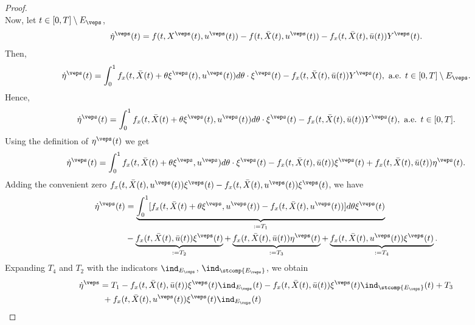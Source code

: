 \begin{proof}
\begin{equation*}
    \end{equation*}
    Now, let $t \in [0,T] \setminus E_{\veps}$,
    \begin{equation*}
        \Dot{\eta}^{\veps}(t) = f(t, X^{\veps}(t), u^{\veps}(t)) - f(t, \Bar{X}(t), u^{\veps}(t)) - f_x(t, \Bar{X}(t), \Bar{u}(t))Y^{\veps}(t).
    \end{equation*}
    Then,
    \begin{equation*}
        \Dot{\eta}^{\veps}(t) = \int_{0}^{1} f_{x}(t, \Bar{X}(t) + \theta \xi^{\veps}(t), u^{\veps}(t))d\theta \cdot  \xi^{\veps}(t)  - f_x(t, \Bar{X}(t), \Bar{u}(t))Y^{\veps}(t), \text{ a.e. } t \in [0,T]\setminus E_{\veps}.
    \end{equation*}
    Hence, 
    \begin{equation*}
        \Dot{\eta}^{\veps}(t) = \int_{0}^{1} f_{x}(t, \Bar{X}(t) + \theta \xi^{\veps}(t), u^{\veps}(t))d\theta \cdot  \xi^{\veps}(t)  - f_x(t, \Bar{X}(t), \Bar{u}(t))Y^{\veps}(t), \text{ a.e. } t \in [0,T] .
    \end{equation*}
    Using the definition of $\eta ^{\veps}(t)$ we get
    \begin{equation*}
        \Dot{\eta}^{\veps}(t) = \int_{0}^{1} f_x(t, \Bar{X}(t) + \theta \xi^{\veps}, u^{\veps})d\theta \cdot \xi^{\veps}(t) - f_x(t, \Bar{X}(t), \Bar{u}(t))\xi^{\veps}(t) + f_x(t, \Bar{X}(t), \Bar{u}(t))\eta^{\veps}(t).
    \end{equation*}
    Adding the convenient zero $f_x(t, \Bar{X}(t), u^{\veps}(t))\xi^{\veps}(t) - f_x(t, \Bar{X}(t), u^{\veps}(t))\xi^{\veps}(t)$, we have
    \begin{align*}
        \Dot{\eta}^{\veps}(t) &= \underbrace{\int_{0}^{1} [f_x(t, \Bar{X}(t) + \theta \xi^{\veps}, %
        u^{\veps}(t)) - f_{x}(t, \Bar{X}(t), u^{\veps}(t))]d\theta \xi^{\veps}(t)}_{:=T_1} \\
        & - \underbrace{f_x(t, \Bar{X}(t), \Bar{u}(t))\xi^{\veps}(t)}_{:=T_2} + \underbrace{f_x(t, \Bar{X}(t), \Bar{u}(t))\eta^{\veps}(t)}_{:=T_3} + \underbrace{f_x(t, \Bar{X}(t), u^{\veps}(t))\xi^{\veps}(t)}_{:=T_4}.
    \end{align*}
    Expanding $T_4$ and $T_2$ with the indicators $\ind_{E_{\veps}}$, 
    $\ind_{\stcomp{E_{\veps}}}$, we obtain
    \begin{align*}
        \Dot{\eta}^{\veps} &=
            T_1 - f_x(t,\Bar{X}(t),\Bar{u}(t))\xi^{\veps}(t)\ind_{E_{\veps}}(t) - 
            f_x(t,\Bar{X}(t),\Bar{u}(t))\xi^{\veps}(t)\ind_{\stcomp{E_{\veps}}}(t) + T_3 \\
            &\,\, + f_x(t, \Bar{X}(t), u^{\veps}(t))\xi^{\veps}(t)\ind_{E_{\veps}}(t)

\end{align*}
\end{proof}
